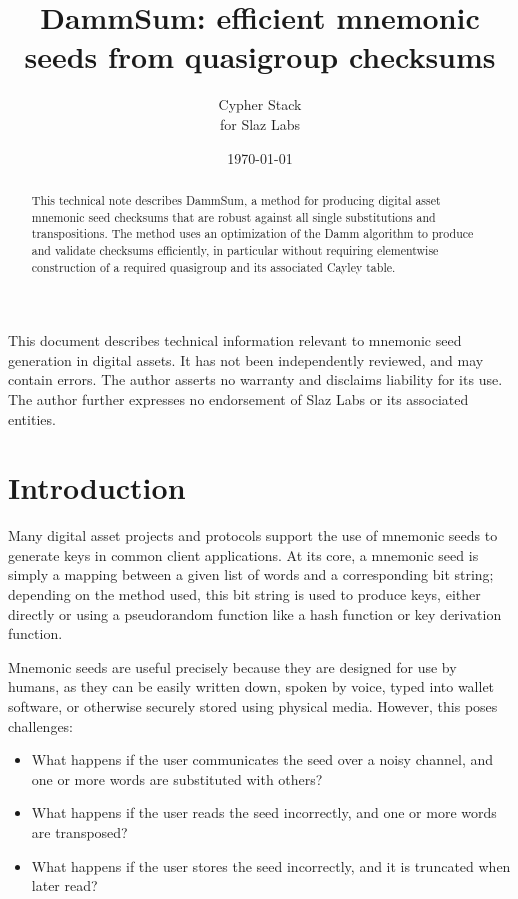 \documentclass{article}
\title{DammSum: efficient mnemonic seeds from quasigroup checksums}
\author{Cypher Stack \\ for Slaz Labs}
\date{\today}
\theoremstyle{plain}
\theoremstyle{definition}
\begin{document}
\maketitle

\begin{abstract}
This technical note describes DammSum, a method for producing digital asset mnemonic seed checksums that are robust against all single substitutions and transpositions.
The method uses an optimization of the Damm algorithm to produce and validate checksums efficiently, in particular without requiring elementwise construction of a required quasigroup and its associated Cayley table.
\end{abstract}

This document describes technical information relevant to mnemonic seed generation in digital assets.
It has not been independently reviewed, and may contain errors.
The author asserts no warranty and disclaims liability for its use.
The author further expresses no endorsement of Slaz Labs or its associated entities.


\section{Introduction}

Many digital asset projects and protocols support the use of mnemonic seeds to generate keys in common client applications.
At its core, a mnemonic seed is simply a mapping between a given list of words and a corresponding bit string; depending on the method used, this bit string is used to produce keys, either directly or using a pseudorandom function like a hash function or key derivation function.

Mnemonic seeds are useful precisely because they are designed for use by humans, as they can be easily written down, spoken by voice, typed into wallet software, or otherwise securely stored using physical media.
However, this poses challenges:
\begin{itemize}
	\item What happens if the user communicates the seed over a noisy channel, and one or more words are substituted with others?
	\item What happens if the user reads the seed incorrectly, and one or more words are transposed?
	\item What happens if the user stores the seed incorrectly, and it is truncated when later read?
\end{itemize}
\end{document}
